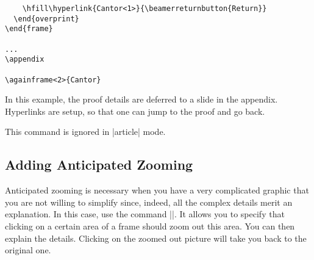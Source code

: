 \begin{command}{\againframe{}}
\begin{verbatim}
    \hfill\hyperlink{Cantor<1>}{\beamerreturnbutton{Return}}
  \end{overprint}
\end{frame}

...
\appendix

\againframe<2>{Cantor}
\end{verbatim}

  In this example, the proof details are deferred to a slide in the appendix. Hyperlinks are setup, so that one can jump to the proof and go back.

  \articlenote
  This command is ignored in |article| mode.

\end{command}


\subsection{Adding Anticipated Zooming}
\label{section-zooming}

Anticipated zooming is necessary when you have a very complicated graphic that you are not willing to simplify since, indeed, all the complex details merit an explanation. In this case, use the command |\framezoom|. It allows you to specify that clicking on a certain area of a frame should zoom out this area. You can then explain the details. Clicking on the zoomed out picture will take you back to the original one.

